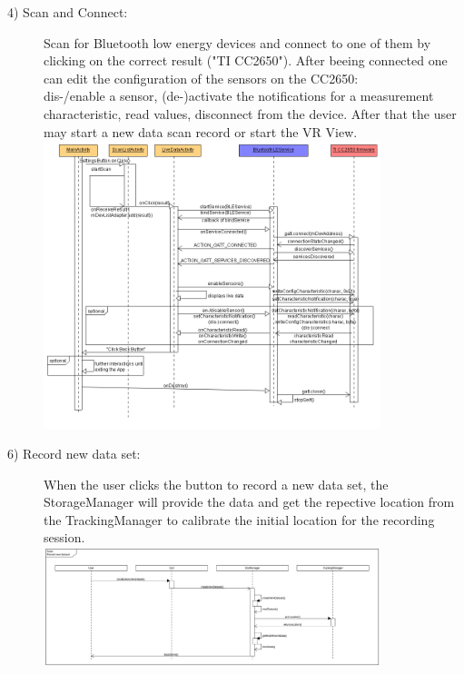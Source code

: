 \begin{description}
	\item[4) Scan and Connect:] Scan for Bluetooth low energy devices and connect to one of them by clicking on the correct result ("TI CC2650").
	After beeing connected one can edit the configuration of the sensors on the CC2650: \\dis-/enable a sensor, (de-)activate the notifications for a measurement characteristic, read values, disconnect from the device. After that the user may start a new data scan record or start the VR View.\\
	\includegraphics[width=0.8\textwidth]{diagramms/bleseq.png}

	\item[6) Record new data set: ] When the user clicks the button to record a new data set, the StorageManager will provide the data and get the repective location from the TrackingManager to calibrate the initial location for the recording session. \\
	\includegraphics[width=0.8\textwidth]{diagramms/newDataset.png}




\end{description}
